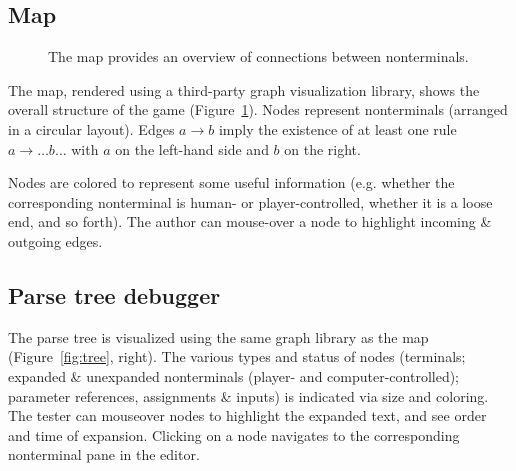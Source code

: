 \documentclass{acm_proc_article-sp}
\begin{document}
\subsection{Map}

\begin{figure}
\caption{
\label{fig:map}
The map provides an overview of connections between nonterminals.
}
\end{figure}

The map, rendered using a third-party graph visualization library,
shows the overall structure of the game (Figure~\ref{fig:map}).
Nodes represent nonterminals (arranged in a circular layout).
Edges $a \to b$ imply the existence of at least one rule $a \to \ldots b \ldots$
with $a$ on the left-hand side and $b$ on the right.

Nodes are colored to represent some useful information
(e.g. whether the corresponding nonterminal is human- or player-controlled,
whether it is a loose end, and so forth).
The author can mouse-over a node to highlight incoming \& outgoing edges.

\subsection{Parse tree debugger}

The parse tree is visualized using the same graph library as the map (Figure~\ref{fig:tree}, right).
The various types and status of nodes (terminals; expanded \& unexpanded nonterminals (player- and computer-controlled); parameter references, assignments \& inputs) is indicated via size and coloring.
The tester can mouseover nodes to highlight the expanded text, and see order and time of expansion.
Clicking on a node navigates to the corresponding nonterminal pane in the editor.
\end{document}
